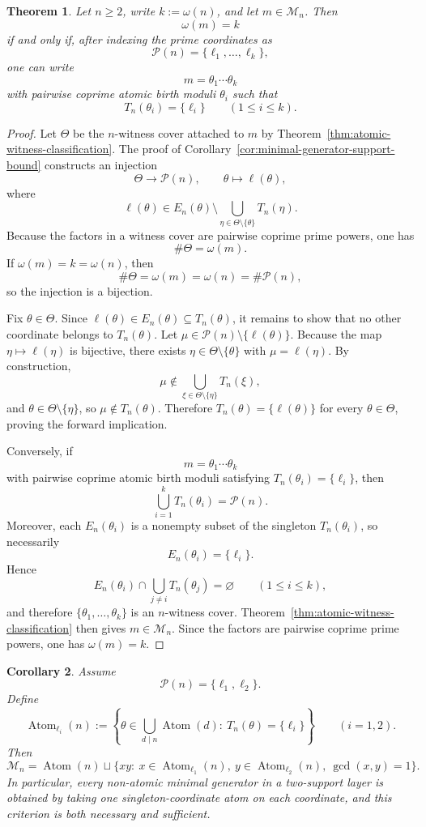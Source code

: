 \documentclass[11pt,letterpaper]{article}
\numberwithin{equation}{section}
\theoremstyle{plain}
\newtheorem{theorem}{Theorem}[section]
\newtheorem{corollary}[theorem]{Corollary}
\theoremstyle{definition}
\theoremstyle{remark}
\DeclareMathOperator{\Atom}{Atom}
\begin{document}
\begin{theorem}
\label{thm:extremal-coordinate-separation}
Let $n\ge 2$, write $k:=\omega(n)$, and let $m\in\mathcal M_n$. Then
\[
\omega(m)=k
\]
if and only if, after indexing the prime coordinates as
\[
\mathcal P(n)=\{\ell_1,\dots,\ell_k\},
\]
one can write
\[
m=\theta_1\cdots \theta_k
\]
with pairwise coprime atomic birth moduli $\theta_i$ such that
\[
T_n(\theta_i)=\{\ell_i\}
\qquad
(1\le i\le k).
\]
\end{theorem}

\begin{proof}
Let $\Theta$ be the $n$-witness cover attached to $m$ by
Theorem~\ref{thm:atomic-witness-classification}. The proof of
Corollary~\ref{cor:minimal-generator-support-bound} constructs an injection
\[
\Theta\longrightarrow\mathcal P(n),
\qquad
\theta\longmapsto \ell(\theta),
\]
where
\[
\ell(\theta)\in E_n(\theta)\setminus
\bigcup_{\eta\in\Theta\setminus\{\theta\}}T_n(\eta).
\]
Because the factors in a witness cover are pairwise coprime prime powers, one
has
\[
\#\Theta=\omega(m).
\]
If $\omega(m)=k=\omega(n)$, then
\[
\#\Theta=\omega(m)=\omega(n)=\#\mathcal P(n),
\]
so the injection is a bijection.

Fix $\theta\in\Theta$. Since $\ell(\theta)\in E_n(\theta)\subseteq T_n(\theta)$,
it remains to show that no other coordinate belongs to $T_n(\theta)$. Let
$\mu\in \mathcal P(n)\setminus\{\ell(\theta)\}$. Because the map
$\eta\mapsto \ell(\eta)$ is bijective, there exists
$\eta\in\Theta\setminus\{\theta\}$ with $\mu=\ell(\eta)$. By construction,
\[
\mu\notin \bigcup_{\xi\in\Theta\setminus\{\eta\}}T_n(\xi),
\]
and $\theta\in \Theta\setminus\{\eta\}$, so $\mu\notin T_n(\theta)$. Therefore
$T_n(\theta)=\{\ell(\theta)\}$ for every $\theta\in\Theta$, proving the forward
implication.

Conversely, if
\[
m=\theta_1\cdots\theta_k
\]
with pairwise coprime atomic birth moduli satisfying
$T_n(\theta_i)=\{\ell_i\}$, then
\[
\bigcup_{i=1}^k T_n(\theta_i)=\mathcal P(n).
\]
Moreover, each $E_n(\theta_i)$ is a nonempty subset of the singleton
$T_n(\theta_i)$, so necessarily
\[
E_n(\theta_i)=\{\ell_i\}.
\]
Hence
\[
E_n(\theta_i)\cap \bigcup_{j\ne i}T_n(\theta_j)=\varnothing
\qquad
(1\le i\le k),
\]
and therefore $\{\theta_1,\dots,\theta_k\}$ is an $n$-witness cover. Theorem~\ref{thm:atomic-witness-classification}
then gives $m\in\mathcal M_n$. Since the factors are pairwise coprime prime
powers, one has $\omega(m)=k$.
\end{proof}

\begin{corollary}
\label{cor:two-support-complete-classification}
Assume
\[
\mathcal P(n)=\{\ell_1,\ell_2\}.
\]
Define
\[
\Atom_{\ell_i}(n):=
\left\{
\theta\in \bigcup_{d\mid n}\Atom(d):\ T_n(\theta)=\{\ell_i\}
\right\}
\qquad
(i=1,2).
\]
Then
\[
\mathcal M_n
=
\Atom(n)
\sqcup
\{xy:\ x\in\Atom_{\ell_1}(n),\ y\in\Atom_{\ell_2}(n),\ \gcd(x,y)=1\}.
\]
In particular, every non-atomic minimal generator in a two-support layer is
obtained by taking one singleton-coordinate atom on each coordinate, and this
criterion is both necessary and sufficient.
\end{corollary}
\end{document}
